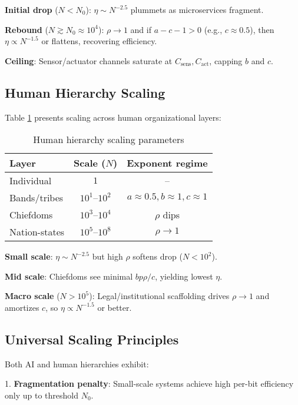 \documentclass[10pt,conference]{IEEEtran}
\begin{document}
\textbf{Initial drop} ($N < N_0$): $\eta \sim N^{-2.5}$ plummets as microservices fragment.

\textbf{Rebound} ($N \gtrsim N_0 \approx 10^4$): $\rho \to 1$ and if $a-c-1 > 0$ (e.g., $c \approx 0.5$), then $\eta \propto N^{-1.5}$ or flattens, recovering efficiency.

\textbf{Ceiling}: Sensor/actuator channels saturate at $C_{\text{sens}}, C_{\text{act}}$, capping $b$ and $c$.

\subsection{Human Hierarchy Scaling}
\label{sec:human_scaling}

Table \ref{tab:human_scaling} presents scaling across human organizational layers:

\begin{table}[!ht]
\centering\footnotesize
\caption{Human hierarchy scaling parameters}
\label{tab:human_scaling}
\begin{tabular}{lcc}
\hline
Layer & Scale ($N$) & Exponent regime \\
\hline
Individual & $1$ & -- \\
Bands/tribes & $10^1$--$10^2$ & $a \approx 0.5, b \approx 1, c \approx 1$ \\
Chiefdoms & $10^3$--$10^4$ & $\rho$ dips \\
Nation-states & $10^5$--$10^8$ & $\rho \to 1$ \\
\hline
\end{tabular}
\end{table}

\textbf{Small scale}: $\eta \sim N^{-2.5}$ but high $\rho$ softens drop ($N < 10^2$).

\textbf{Mid scale}: Chiefdoms see minimal $bp\rho/c$, yielding lowest $\eta$.

\textbf{Macro scale} ($N > 10^5$): Legal/institutional scaffolding drives $\rho \to 1$ and amortizes $c$, so $\eta \propto N^{-1.5}$ or better.

\subsection{Universal Scaling Principles}
\label{sec:universal}

Both AI and human hierarchies exhibit:

1. \textbf{Fragmentation penalty}: Small-scale systems achieve high per-bit efficiency only up to threshold $N_0$.
\end{document}
